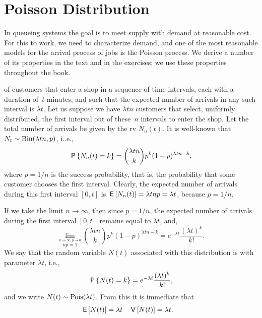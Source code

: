 \documentclass[stochastic-or.tex]{subfiles}
\begin{document}
\section{Poisson Distribution}\label{sec:poisson-distribution}

In queueing systems the goal is to meet supply with demand at reasonable cost.
For this to work, we need to characterize demand, and one of the most reasonable models for the arrival process of jobs is the Poisson process.
We derive a number of its properties in the text and in the exercises; we use these properties throughout the book.



 of customers that enter a shop in a sequence of time intervals, each with a duration of~$t$ minutes, and such that the expected number of arrivals in  any such interval is $\lambda t$.
Let us suppose we have $\lambda t n$ customers that select, uniformly distributed, the first interval out of these~$n$ intervals to enter the shop.
Let the total number of arrivals be given by the rv $N_n(t)$. It is well-known that $N_{t} \sim \Bin{\lambda t n, p}$, i..e.,
\begin{equation*}
 \P{N_n(t) = k} = {\lambda t n \choose k} p^k (1-p)^{\lambda t n-k},
\end{equation*}
where  $p=1/n$ is the success probability, that is, the probability that some customer chooses the first interval.
Clearly, the expected number of arrivals during this first interval $[0,t]$ is $\E{N_n(t)} = \lambda t n p = \lambda t$, because $p=1/n$.

If we take the limit $n\to\infty$, then since $p=1/n$,  the expected number of arrivals during the first interval $[0,t]$ remains equal to $\lambda t$,
and,
\begin{equation}\label{eq:bin}
  \lim_{\stackrel{n\to\infty, p\to 0}{np=1}}{\lambda t n \choose k} p^k (1-p)^{\lambda t n -k} = e^{-\lambda t}\frac{(\lambda t)^k}{k!}.
\end{equation}
We say that the random variable $N(t)$
associated with this distribution is  with parameter $\lambda t$, i.e.,
\begin{equation*}
 \P{N(t) = k} =
e^{-\lambda t} \frac{(\lambda t)^k}{k!},
\end{equation*}
and we write $N(t)\sim \Pois{\lambda t}$.%
From this it is immediate that
\begin{align}
\E{N(t)} &= \lambda t
& \V{N(t)} &= \lambda t.
\end{align}
\end{document}
